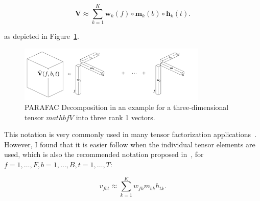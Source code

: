 \begin{equation}
   \mathbf{V} \approx \sum\limits_{k=1}^{K} \mathbf{w}_{k}(f) \circ \mathbf{m}_{k}(b) \circ \mathbf{h}_{k}(t).
\end{equation}

as depicted in Figure~\ref{fig:cpd}.
\begin{figure}[h]
  \centering
  \includegraphics[width=0.8\textwidth]{Chapters/06_Separation_Unknown/figures/cpd.pdf}
  \caption{PARAFAC Decomposition in an example for a three-dimensional tensor \(mathbf{V}\) into three rank 1 vectors.}
  \label{fig:cpd}
\end{figure}
This notation is very commonly used in many tensor factorization applications~\cite{kolda09}.
However, I found that it is easier follow when the individual tensor elements are used, which is also the recommended notation proposed in~\cite{kiers00}, for  $f = 1 , \ldots , F , b = 1 , \ldots , B , t = 1 , \ldots , T$:

\begin{equation}
  v_{fbt} \approx \sum_{k = 1}^{K} w_{fk} m_{bk} h_{tk}.
\end{equation}

